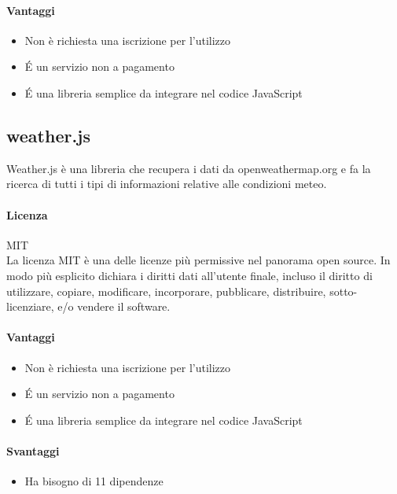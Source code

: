 \paragraph{Vantaggi}
\begin{itemize}
	\item Non è richiesta una iscrizione per l'utilizzo
	\item \'E un servizio non a pagamento
	\item \'E una libreria semplice da integrare nel codice JavaScript
\end{itemize}


\subsection{weather.js}

Weather.js è una libreria che recupera i dati da openweathermap.org e
fa la ricerca di tutti i tipi di informazioni relative alle condizioni
meteo. 

\paragraph{Licenza} MIT \\
La licenza MIT è una delle licenze più permissive nel panorama open
source. In modo più esplicito dichiara i diritti dati all'utente
finale, incluso il diritto di utilizzare, copiare, modificare,
incorporare, pubblicare, distribuire, sotto-licenziare, e/o vendere il
software. \\

\paragraph{Vantaggi}
\begin{itemize}
	\item Non è richiesta una iscrizione per l'utilizzo
	\item \'E un servizio non a pagamento
	\item \'E una libreria semplice da integrare nel codice JavaScript
\end{itemize}

\paragraph{Svantaggi} 
\begin{itemize}
	\item Ha bisogno di 11 dipendenze 
\end{itemize}


